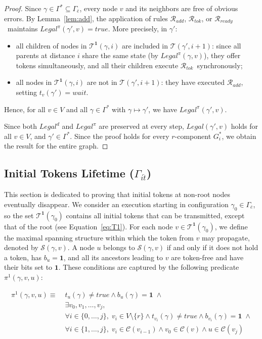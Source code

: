 \documentclass[a4paper, 12pt]{article}
\newcommand{\Ch}{\mathcal{C}}
\newcommand{\bo}{\mathbf{1}}
\newcommand{\Rtok}{$\mathscr{R}_{tok}$}
\newcommand{\Radd}{$\mathscr{R}_{add}$}
\newcommand{\Rready}{$\mathscr{R}_{ready}$}
\begin{document}
\begin{proof}
Since $\gamma \in \Gamma^* \subseteq \Gamma_{\bar{e}}$, every node 
$v$ and its neighbors are free of obvious errors. By 
Lemma~\ref{lem:add}, the application of rules \Radd, \Rtok, or 
\Rready\ maintains $Legal^{\pi}(\gamma', v) = \mathit{true}$. More 
precisely, in $\gamma'$:
\begin{itemize}
    \item all children of nodes in $\mathcal{T}^{\bo}(\gamma, i)$ 
    are included in $\mathcal{T}(\gamma', i+1)$: since all parents 
    at distance $i$ share the same state (by $Legal^\pi(\gamma,v)$), 
    they offer tokens simultaneously, and all their children execute 
    \Rtok\ synchronously;
    \item all nodes in $\mathcal{T}^{\bo}(\gamma, i)$ are not in 
    $\mathcal{T}(\gamma', i+1)$: they have executed \Radd, setting 
    $t_v(\gamma') = \mathit{wait}$.
\end{itemize}
Hence, for all $v \in V$ and all $\gamma \in \Gamma^*$ with 
$\gamma \mapsto \gamma'$, we have $Legal^\pi(\gamma', v)$.

\medskip
Since both $Legal^d$ and $Legal^\pi$ are preserved at every step, 
$Legal(\gamma', v)$ holds for all $v \in V$, and $\gamma' \in 
\Gamma^*$. Since the proof holds for every $r$-component $G^*_i$, 
we obtain the result for the entire graph.
\end{proof}
\subsection{Initial Tokens Lifetime ($\Gamma_{\bar{it}}$)}
\label{subsec:tokenlifetime}

This section is dedicated to proving that initial tokens at non-root 
nodes eventually disappear. We consider an execution starting in 
configuration $\gamma_0 \in \Gamma_{\bar{e}}$, so the set 
$\mathcal{T}^{\bo}(\gamma_0)$ contains all initial tokens that can be 
transmitted, except that of the root (see Equation~\ref{eq:T1}). For 
each node $v \in \mathcal{T}^{\bo}(\gamma_0)$, we define the maximal 
spanning structure within which the token from $v$ may propagate, 
denoted by $\mathcal{S}(\gamma, v)$. A node $u$ belongs to 
$\mathcal{S}(\gamma, v)$ if and only if it does not hold a token, has 
$b_u = \bo$, and all its ancestors leading to $v$ are token-free and 
have their bits set to $\bo$. These conditions are captured by the 
following predicate $\pi^1(\gamma, v, u)$:

\begin{equation}
\begin{split}
    \pi^1(\gamma,v,u) \equiv\; 
    &t_{u}(\gamma) \neq \mathit{true} \wedge b_{u}(\gamma) = \bo \;\wedge \\
    &\exists v_0, v_1, \dots, v_j, \\
    &\forall i \in \{0,\ldots,j\},\;
    v_i \in V \setminus \{r\} \wedge 
    t_{v_i}(\gamma) \neq \mathit{true} \wedge b_{v_i}(\gamma) = \bo \;\wedge \\
    &\forall i \in \{1,\ldots,j\},\;
    v_i \in \Ch(v_{i-1}) \wedge v_0 \in \Ch(v) \wedge u \in \Ch(v_j)
\end{split}
\end{equation}
\end{document}
